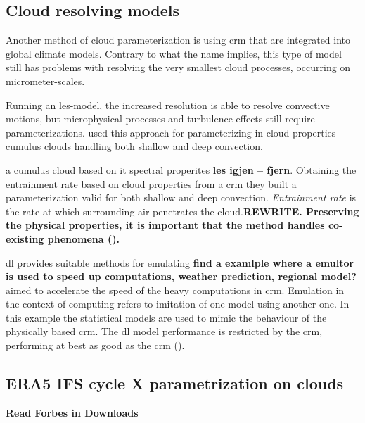 \subsection{Cloud resolving models} \label{sec:params_climate_models}
Another method of cloud parameterization is using \acrfull{crm} that are integrated into global climate models. Contrary to what the name implies, this type of model still has problems with resolving the very smallest cloud processes, occurring on micrometer-scales. 

Running an \acrfull{les}-model, the increased resolution is able to resolve convective motions, but microphysical processes and turbulence effects still require parameterizations. \citeauthor{Baba2019SpectralModel} used this approach for parameterizing in cloud properties cumulus clouds handling both shallow and deep convection.

a cumulus cloud based on it spectral properites \textbf{les igjen -- fjern}. Obtaining the entrainment rate based on cloud properties from a \acrshort{crm} they built a parameterization valid for both shallow and deep convection. \textit{Entrainment rate} is the rate at which surrounding air penetrates the cloud.\textbf{REWRITE. Preserving the physical properties, it is important that the method handles co-existing phenomena (\cite{Baba2019SpectralModel}). }

\acrshort{dl} provides suitable methods for emulating \textbf{find a examlple where a emultor is used to speed up computations, weather prediction, regional model?} %
aimed to accelerate the speed of the heavy computations in \acrshort{crm}. Emulation in the context of computing refers to imitation of one model using another one. In this example the statistical models are used to mimic the behaviour of the physically based \acrshort{crm}. The \acrshort{dl} model performance is restricted by the  \acrshort{crm}, performing at best as good as the \acrshort{crm} (\cite{Rasp2018DeepModels}).

\subsection{ERA5 IFS cycle X parametrization on clouds}
\textbf{Read Forbes in Downloads}